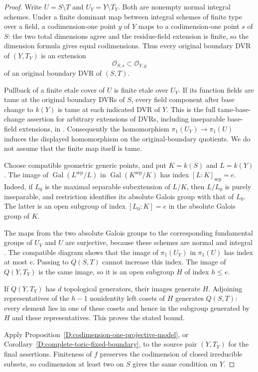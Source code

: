 \begin{proof}
Write $U=S\setminus T$ and $U_Y=Y\setminus T_Y$.
Both are nonempty normal integral schemes. Under a finite dominant
map between integral schemes of finite type over a field, a
codimension-one point $y$ of $Y$ maps to a codimension-one point
$s$ of $S$: the two total dimensions agree and the residue-field
extension is finite, so the dimension formula gives equal
codimensions. Thus every original boundary DVR of $(Y,T_Y)$ is
an extension
\[
                     \mathcal O_{S,s}\subset\mathcal O_{Y,y}
\]
of an original boundary DVR of $(S,T)$.

Pullback of a finite etale cover of $U$ is finite etale over $U_Y$.
If its function fields are tame at the original boundary DVRs of
$S$, every field component after base change to $k(Y)$ is tame at
each indicated DVR of $Y$. This is the full tame-base-change
assertion for arbitrary extensions of DVRs, including inseparable
base-field extensions, in
\citep[Lemma~15.116.9(2), tag 0EXY]{StacksDFiniteTameDescent}.
Consequently the homomorphism $\pi_1(U_Y)\to\pi_1(U)$ induces the
displayed homomorphism on the original-boundary quotients. We do
not assume that the finite map itself is tame.

Choose compatible geometric generic points, and put
$K=k(S)$ and $L=k(Y)$. The image of
$\operatorname{Gal}(L^{\mathrm{sep}}/L)$ in
$\operatorname{Gal}(K^{\mathrm{sep}}/K)$ has index
$[L:K]_{\mathrm{sep}}=e$. Indeed, if $L_0$ is the maximal
separable subextension of $L/K$, then $L/L_0$ is purely
inseparable, and restriction identifies its absolute Galois
group with that of $L_0$. The latter is an open subgroup of
index $[L_0:K]=e$ in the absolute Galois group of $K$.

The maps from the two absolute Galois groups to the corresponding
fundamental groups of $U_Y$ and $U$ are surjective, because these
schemes are normal and integral
\citep[Proposition~58.11.3, tag 0BQM; Lemma~58.10.7,
tag 0BQI]{StacksDFiniteTameDescent}. The compatible diagram shows
that the image of $\pi_1(U_Y)$ in $\pi_1(U)$ has index at most
$e$. Passing to $Q(S,T)$ cannot increase this index. The image
of $Q(Y,T_Y)$ is the same image, so it is an open subgroup $H$
of index $h\le e$.

If $Q(Y,T_Y)$ has $d$ topological generators, their images
generate $H$. Adjoining representatives of the $h-1$ nonidentity
left cosets of $H$ generates $Q(S,T)$: every element lies in one
of these cosets and hence in the subgroup generated by $H$ and
these representatives. This proves the stated bound.

Apply Proposition~\ref{D:codimension-one-projective-model}, or
Corollary~\ref{D:complete-toric-fixed-boundary}, to the source
pair $(Y,T_Y)$ for the final assertions. Finiteness of $f$
preserves the codimension of closed irreducible subsets, so
codimension at least two on $S$ gives the same condition on $Y$.
\end{proof}

